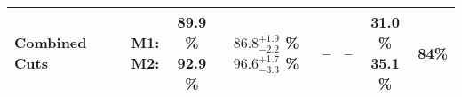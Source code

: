 \begin{tabular}{|>{\raggedright}m{3cm}|m{6cm}|c c c|c c|c|c|}
  Combined Cuts &  & \makecell{M1: \\ M2:} & \makecell{89.9 \% \\ 92.9 \%} & \makecell{$86.8^{+1.9}_{-2.2}$ \% \\ $96.6^{+1.7}_{-3.3}$ \%} & -- & -- & \makecell{31.0 \% \\ 35.1 \%} & 84\% \\
\hline
\end{tabular}
